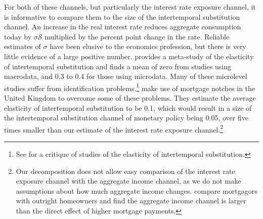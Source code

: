 \documentclass[titlepage]{\econtex}\newcommand{\texname}{ConsumptionHeterogeneity}
\begin{document}
	For both of these channels, but particularly the interest rate exposure channel, it is informative to compare them to the size of the intertemporal substitution channel. An increase in the real interest rate reduces aggregate consumption today by $\sigma \mathcal{S}$ multiplied by the percent point change in the rate. Reliable estimates of $\sigma$ have been elusive to the economics profession, but there is very little evidence of a large positive number. \cite{havranek_measuring_2015} provides a meta-study of the elasticity of intertemporal substitution and finds a mean of zero from studies using macrodata, and 0.3 to 0.4 for those using microdata. Many of these microlevel studies suffer from identification problems.\footnote{See \cite{carroll_death_2001} for a critique of studies of the elasticity of intertemporal substitution.} \cite{best_estimating_2018} make use of mortgage notches in the United Kingdom to overcome some of these problems. They estimate the average elasticity of intertemporal substitution to be 0.1, which would result in a size of the intertemporal substitution channel of monetary policy being 0.05, over five times smaller than our estimate of the interest rate exposure channel.\footnote{Our decomposition does not allow easy comparison of the interest rate exposure channel with the aggregate income channel, as we do not make assumptions about how much aggregate income changes. \cite{cloyne_monetary_2016} compare mortgagors with outright homeowners and find the aggregate income channel is larger than the direct effect of higher mortgage payments.}
	
\end{document}
